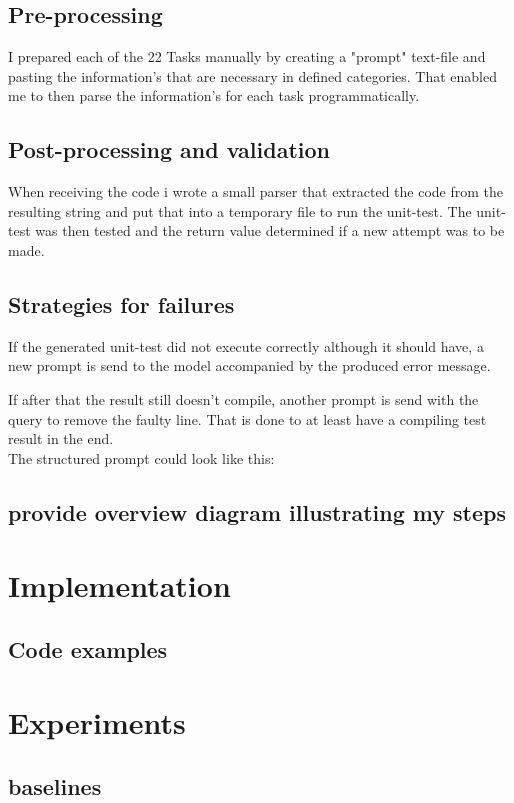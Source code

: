 \documentclass[a4paper,11pt,oneside]{memoir}
\begin{document}
\section{Pre-processing}
I prepared each of the 22 Tasks manually by creating a "prompt" text-file and pasting the information's that are necessary in defined categories. That enabled me to then parse the information's for each task programmatically.
\section{Post-processing and validation}
When receiving the code i wrote a small parser that extracted the code from the resulting string and put that into a temporary file to run the unit-test.
The unit-test was then tested and the return value determined if a new attempt was to be made.
\section{Strategies for failures}
If the generated unit-test did not execute correctly although it should have, a new prompt is send to the model accompanied by the produced error message. 

If after that the result still doesn't compile, another prompt is send with the query to remove the faulty line. That is done to at least have a compiling test result in the end.
\\The structured prompt could look like this:


\section{provide overview diagram illustrating my steps}

\chapter{Implementation}
\section{ Code examples}

\chapter{Experiments}
\section{baselines}
\end{document}
